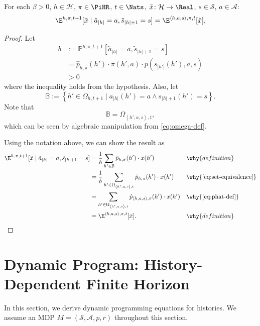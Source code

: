 \begin{theorem} \label{thm:exph-cond-eq-hist}
For each $\beta >0$, $h\in \mathcal{H}$, $\pi\in \PiHR$, $t\in \Nats$, $\tilde{x}\colon \mathcal{H} \to \Real$, $s\in \mathcal{S}$, $a\in \mathcal{A}$:
\[
  \E^{h,\pi,t+1}[\tilde{x} \mid \tilde{a}_{|h|} = a, \tilde{s}_{|h|+1} = s]
  =
  \E^{\langle h, a, s\rangle,\pi,t}[\tilde{x}],
\]
\end{theorem}
\begin{proof}
  Let
  \[
    \begin{aligned}
      b &:= \mathbb{P}^{h,\pi,t+1} \left[ \tilde{a}_{|h|} = a, \tilde{s}_{|h|+1} = s \right] \\
      &= \hat{p}_{h,\pi}(h') \cdot  \pi(h', a) \cdot p(s_{|h'|}(h'), a, s) \\
       &> 0
    \end{aligned}
  \]
  where the inequality holds from the hypothesis. Also, let
  \[
    \mathbb{B} := \left\{ h'\in \Omega_{h,t+1} \mid a_{|h|}(h') = a \wedge s_{|h|+1}(h') = s\right\}.
  \]
  Note that
  \begin{equation} \label{eq:set-equivalence}
    \mathbb{B} = \Omega_{\left< h', a, s \right>, t},
\end{equation}
  which can be seen by algebraic manipulation from \eqref{eq:omega-def}.

  Using the notation above, we can show the result as
  \begin{align*}
  \E^{h,\pi,t+1}[\tilde{x} \mid \tilde{a}_{|h|} = a, \tilde{s}_{|h|+1} = s]
  &= \frac{1}{b} \sum_{h'\in \mathbb{B}} \hat{p}_{h,\pi}(h') \cdot x(h')
  && \why{definition}\\
  &= \frac{1}{b} \sum_{h'\in \Omega_{\left< h', a, s \right>, t}} \hat{p}_{h,\pi}(h') \cdot x(h')
  && \why{\cref{eq:set-equivalence}} \\
  &= \sum_{h'\in \Omega_{\left< h', a, s \right>, t}} \hat{p}_{\left<h, a,s  \right>,\pi}(h') \cdot x(h')
  && \why{\cref{eq:phat-def}} \\
  &= \E^{\langle h, a, s\rangle,\pi,t}[\tilde{x}]. && \why{definition}
  \end{align*}
\end{proof}

\section{Dynamic Program: History-Dependent Finite Horizon}

In this section, we derive dynamic programming equations for histories. We assume an MDP $M = (\mathcal{S}, \mathcal{A}, p, r)$ throughout this section.

